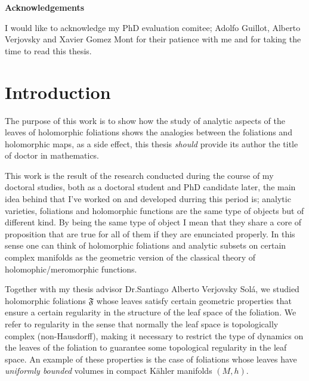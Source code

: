 \documentclass[12pt,twoside,a4paper]{report}
\begin{document}
\clearpage
\thispagestyle{plain}
\begin{center}
    \huge\textbf{Acknowledgements}\\
\end{center}
    \normalsize
    I would like to acknowledge my PhD evaluation comitee; Adolfo Guillot, Alberto Verjovsky and Xavier Gomez Mont for their patience with me and for taking the time to read this thesis.
\clearpage


\tableofcontents %
\listoftables   %


\chapter{Introduction}
\pagestyle{fancy}
\fancyhf{}
\fancyhead[LE]{\rightmark}
\fancyhead[RO]{\leftmark}
\fancyfoot[C]{\thepage}
\noindent The purpose of this work is to show how the study of analytic aspects of the leaves of holomorphic foliations shows the analogies between the foliations and holomorphic maps, as a side effect, this thesis \emph{should} provide its author the title of doctor in mathematics.

This work is the result of the research conducted during the course of my doctoral studies, both as a doctoral student and PhD candidate later, the main idea behind that I've worked on and developed durring this period is; analytic varieties, foliations and holomorphic functions are the same type of objects but of different kind. By being the same type of object I mean that they share a core of proposition that are true for all of them if they are enunciated properly. In this sense one can think of holomorphic foliations and analytic subsets on certain complex manifolds as the geometric version of the classical theory of holomophic/meromorphic functions.

Together with my thesis advisor Dr.Santiago Alberto Verjovsky Solá, we studied holomorphic foliations $\mathfrak{F}$ whose leaves satisfy certain geometric properties that ensure a certain regularity in the structure of the leaf space of the foliation. We refer to regularity in the sense that normally the leaf space is topologically complex (non-Hausdorff), making it necessary to restrict the type of dynamics on the leaves of the foliation to guarantee some topological regularity in the leaf space. An example of these properties is the case of foliations whose leaves have \emph{uniformly bounded} volumes in compact K\"ahler manifolds $(M,h)$.
\end{document}
